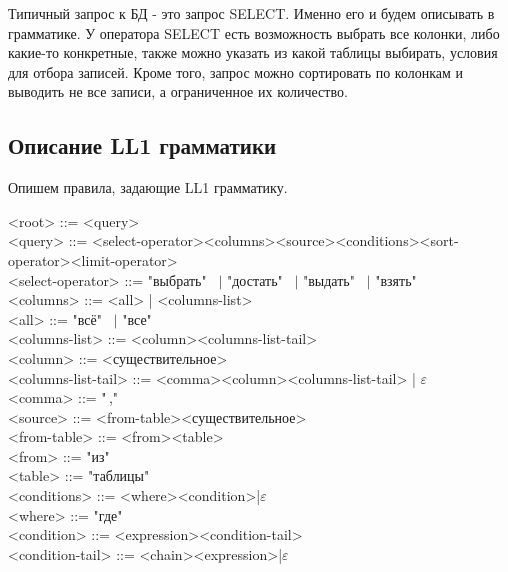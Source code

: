 \documentclass[12pt, a4paper]{article}
\begin{document}
    Типичный запрос к БД - это запрос SELECT. Именно его и будем описывать в грамматике. 
    У оператора SELECT есть возможность выбрать все колонки, либо какие-то конкретные, также можно указать из какой таблицы выбирать,
    условия для отбора записей. Кроме того, запрос можно сортировать по колонкам и выводить не все записи, а ограниченное их количество.

    \subsection{Описание LL1 грамматики}
    Опишем правила, задающие LL1 грамматику.
        \begin{tcolorbox}[
                        width=1.05\textwidth,
                        left=2mm,              
                        right=2mm,              
                        top=2mm,                
                        bottom=2mm,             
                        boxsep=1mm]
            <root> ::= <query> \\
            <query> ::= <select-operator><columns><source><conditions><sort-operator><limit-operator> \\
            <select-operator> ::= "выбрать" \ $|$ "достать" \ $|$ "выдать" \ $|$ "взять" \\
            <columns> ::= <all> | <columns-list> \\
            <all> ::= "всё" \ $|$ "все" \\
            <columns-list> ::= <column><columns-list-tail> \\
            <column> ::= <существительное> \\ 
            <columns-list-tail> ::= <comma><column><columns-list-tail> | $\varepsilon$ \\
            <comma> ::= "\,," \\
            <source> ::= <from-table><существительное> \\
            <from-table> ::= <from><table> \\ 
            <from> ::= "из" \\
            <table> ::= "таблицы" \\
            <conditions> ::= <where><condition>|$\varepsilon$ \\
            <where> ::= "где" \\ 
            <condition> ::= <expression><condition-tail> \\
            <condition-tail> ::= <chain><expression>|$\varepsilon$ \\

\end{tcolorbox}
\end{document}

